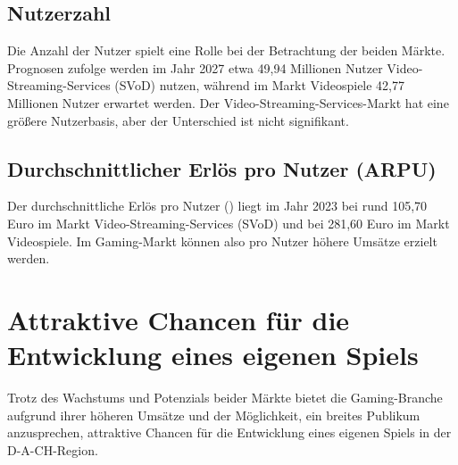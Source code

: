 \subsection{Nutzerzahl}

Die Anzahl der Nutzer spielt eine Rolle bei der Betrachtung der beiden Märkte. Prognosen zufolge werden im Jahr 2027 etwa 49,94 Millionen Nutzer Video-Streaming-Services (SVoD) nutzen, während im Markt Videospiele 42,77 Millionen Nutzer erwartet werden. Der Video-Streaming-Services-Markt hat eine größere Nutzerbasis, aber der Unterschied ist nicht signifikant.

\subsection{Durchschnittlicher Erlös pro Nutzer (ARPU)}

Der durchschnittliche Erlös pro Nutzer () liegt im Jahr 2023 bei rund 105,70 Euro im Markt Video-Streaming-Services (SVoD) und bei 281,60 Euro im Markt Videospiele. Im Gaming-Markt können also pro Nutzer höhere Umsätze erzielt werden.

\section{Attraktive Chancen für die Entwicklung eines eigenen Spiels}

Trotz des Wachstums und Potenzials beider Märkte bietet die Gaming-Branche aufgrund ihrer höheren Umsätze und der Möglichkeit, ein breites Publikum anzusprechen, attraktive Chancen für die Entwicklung eines eigenen Spiels in der D-A-CH-Region.